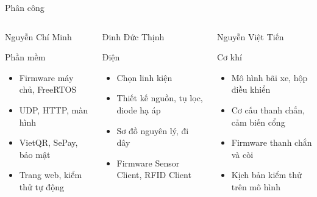 \documentclass[aspectratio=169,11pt]{beamer}
\newcommand{\bt}[1]{\rule[-0.7ex]{0pt}{3.1ex}#1}
\begin{document}
\begin{frame}{Phân công}
\small
\begin{columns}[T]
\begin{block}{\bt{Nguyễn Chí Minh}}
\scriptsize Phần mềm
\begin{itemize}
  \item Firmware máy chủ, FreeRTOS
  \item UDP, HTTP, màn hình
  \item VietQR, SePay, bảo mật
  \item Trang web, kiểm thử tự động
\end{itemize}
\end{block}
\begin{block}{\bt{Đinh Đức Thịnh}}
\scriptsize Điện
\begin{itemize}
  \item Chọn linh kiện
  \item Thiết kế nguồn, tụ lọc, diode hạ áp
  \item Sơ đồ nguyên lý, đi dây
  \item Firmware Sensor Client, RFID Client
\end{itemize}
\end{block}
\begin{block}{\bt{Nguyễn Việt Tiến}}
\scriptsize Cơ khí
\begin{itemize}
  \item Mô hình bãi xe, hộp điều khiển
  \item Cơ cấu thanh chắn, cảm biến cổng
  \item Firmware thanh chắn và còi
  \item Kịch bản kiểm thử trên mô hình
\end{itemize}
\end{block}
\end{columns}
\end{frame}

\begin{frame}[plain]
\end{frame}
\end{document}
